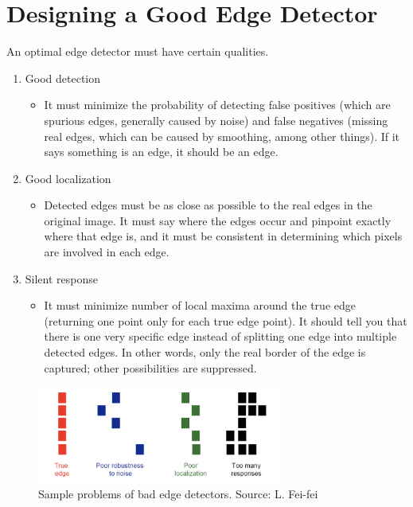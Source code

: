 \documentclass{article}
\begin{document}
\section{Designing a Good Edge Detector}
An optimal edge detector must have certain qualities.
\begin{enumerate}
    \item Good detection
    \begin{itemize}
        \item It must minimize the probability of detecting false positives (which are spurious edges, generally caused by noise) and false negatives (missing real edges, which can be caused by smoothing, among other things). If it says something is an edge, it should be an edge.
    \end{itemize}
    \item Good localization
    \begin{itemize}
        \item Detected edges must be as close as possible to the real edges in the original image. It must say where the edges occur and pinpoint exactly where that edge is, and it must be consistent in determining which pixels are involved in each edge.
    \end{itemize}
    \item Silent response
    \begin{itemize}
        \item It must minimize number of local maxima around the true edge (returning one point only for each true edge point). It should tell you that there is one very specific edge instead of splitting one edge into multiple detected edges. In other words, only the real border of the edge is captured; other possibilities are suppressed.
    \end{itemize}
\end{enumerate}

\begin{figure}[H]
\centering
\includegraphics[width=8cm]{fei-fei_detection.png}
\caption{Sample problems of bad edge detectors. Source: L. Fei-fei}
\end{figure}

% 
% 
\end{document}
